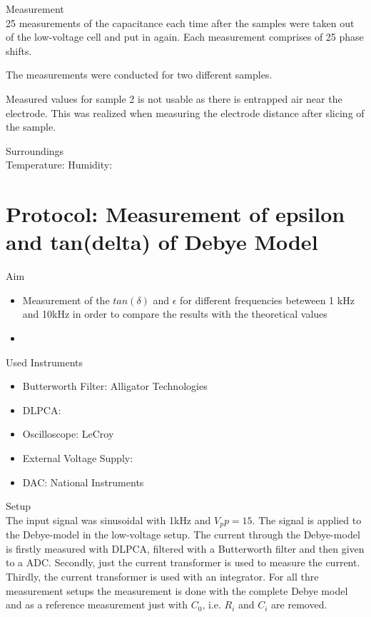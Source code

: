 \large{Measurement} \\
25 measurements of the capacitance each time after the samples were taken out of the low-voltage cell and put in again. Each measurement comprises of 25 phase shifts. 

The measurements were conducted for two different samples.

Measured values for sample 2 is not usable as there is entrapped air near the electrode. This was realized when measuring the electrode distance after slicing of the sample.

\large{Surroundings} \\
Temperature: 
Humidity: 

\section{Protocol: Measurement of epsilon and tan(delta) of Debye Model}
\large{Aim} \\
\begin{itemize}
\item Measurement of the $tan(\delta)$ and $\epsilon$ for different frequencies beteween 1 kHz and 10kHz in order to compare the results with the theoretical values
\item  
\end{itemize}


\large{Used Instruments} 
\begin{itemize}
 \item Butterworth Filter: Alligator Technologies 
 \item DLPCA: 
 \item Oscilloscope: LeCroy
 \item External Voltage Supply: 
 \item DAC: National Instruments 

\end{itemize}


\large{Setup} \\
The input signal was  sinusoidal with 1kHz and $V_pp=15$. The signal is applied to the Debye-model in the low-voltage setup. The current through the Debye-model is firstly measured with DLPCA, filtered with a Butterworth filter and then given to a ADC. Secondly, just the current transformer is used to measure the current. Thirdly, the current transformer is used with an integrator. 
For all thre measurement setups the measurement is done with the complete Debye model and as a reference measurement just with $C_0$, i.e. $R_i$ and $C_i$ are removed. 

